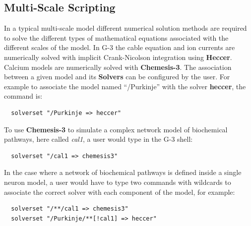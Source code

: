 \documentclass{article}
\begin{document}


\subsection{Multi-Scale Scripting}

In  a typical multi-scale model
different numerical solution methods are required to solve the different
types of mathematical equations associated with the different scales of the
model.  In G-3 the cable equation and ion currents are numerically solved with
implicit Crank-Nicolson integration using {\bf Heccer}.  Calcium models are numerically solved with {\bf Chemesis-3}.
The association between a given model and its {\bf Solvers} can be configured by the user.
For example to associate the model named ``/Purkinje'' with the solver {\bf heccer}, the command is:
\begin{verbatim}
  solverset "/Purkinje => heccer"
\end{verbatim}

To use {\bf Chemesis-3} to simulate a complex network model of
biochemical pathways, here called {\it cal1}, a user would type in the
G-3 shell:

\begin{verbatim}
  solverset "/cal1 => chemesis3"
\end{verbatim}

In the case where a network of biochemical pathways is defined inside a
single neuron model, a user would have to type two commands with
wildcards to associate the correct solver with each component of the
model, for example:

\begin{verbatim}
  solverset "/**/cal1 => chemesis3"
  solverset "/Purkinje/**[!cal1] => heccer"
\end{verbatim}

\end{document}
